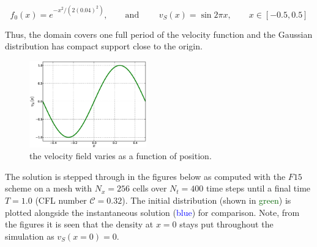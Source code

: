 \documentclass[11pt,titlepage]{report}
\begin{document}
\begin{equation}
f_0(x) = e^{-x^2 / (2(0.04)^2)}, \qquad \text{and } \qquad v_S(x) = \sin 2\pi x, \qquad x\in [-0.5, 0.5]
\end{equation}

\noindent Thus, the domain covers one full period of the velocity function and the Gaussian distribution has compact support close to the origin. 

 \begin{figure}[h!]
  \centering
    \includegraphics[width=0.45\textwidth]{graphics/v_S}
  \caption{the velocity field varies as a function of position.}
  \label{fig:v_S}
\end{figure}

\noindent The solution is stepped through in the figures below as computed with the $F15$ scheme on a mesh with $N_x = 256$ cells over  $N_t = 400$ time steps until a final time $T = 1.0$ (CFL number $\mathcal{C} = 0.32$). The initial distribution (shown in \textcolor{darkgreen}{green}) is plotted alongside the instantaneous solution (\textcolor{blue}{blue}) for comparison. Note, from the figures it is seen that the density at $x = 0$ stays put throughout the simulation as $v_S(x=0) = 0$.
\end{document}

